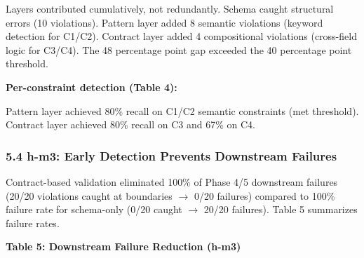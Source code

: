 Layers contributed cumulatively, not redundantly. Schema caught structural errors (10 violations). Pattern layer added 8 semantic violations (keyword detection for C1/C2). Contract layer added 4 compositional violations (cross-field logic for C3/C4). The 48 percentage point gap exceeded the 40 percentage point threshold.

\textbf{Per-constraint detection (Table 4):}

\begin{table}[htbp]
\centering
{}
\end{table}

Pattern layer achieved 80\% recall on C1/C2 semantic constraints (met threshold). Contract layer achieved 80\% recall on C3 and 67\% on C4.

\subsubsection{5.4 h-m3: Early Detection Prevents Downstream Failures}

Contract-based validation eliminated 100\% of Phase 4/5 downstream failures (20/20 violations caught at boundaries $\rightarrow$ 0/20 failures) compared to 100\% failure rate for schema-only (0/20 caught $\rightarrow$ 20/20 failures). Table 5 summarizes failure rates.

\textbf{Table 5: Downstream Failure Reduction (h-m3)}

\begin{table}[htbp]
\centering
{}
\end{table}

